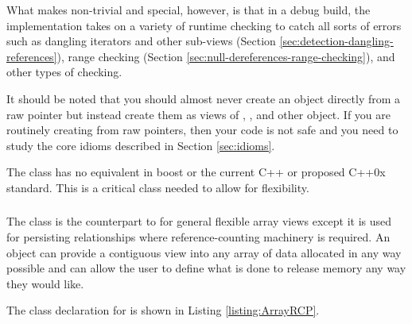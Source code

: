 \documentclass[pdf,ps2pdf,11pt]{SANDreport}
\begin{document}
What makes {} non-trivial and special, however, is
that in a debug build, the implementation takes on a variety of
runtime checking to catch all sorts of errors such as dangling
iterators and other sub-views (Section
{}\ref{sec:detection-dangling-references}), range checking (Section
{}\ref{sec:null-dereferences-range-checking}), and other types of
checking.

It should be noted that you should almost never create an
{} object directly from a raw pointer but instead
create them as views of {}, {},
{} and other {} object.  If you are
routinely creating {} from raw pointers, then your
code is not safe and you need to study the core idioms described in
Section {}\ref{sec:idioms}.

The class {} has no equivalent in boost or the
current C++ or proposed C++0x standard.  This is a critical class
needed to allow for flexibility.


%
{}\subsubsection{}
%

The class {} is the counterpart to
{} for general flexible array views except it is
used for persisting relationships where reference-counting machinery
is required.  An {} object can provide a contiguous
view into any array of data allocated in any way possible and can
allow the user to define what is done to release memory any way they
would like.

The class declaration for {} is shown in
Listing {}\ref{listing:ArrayRCP}.
\end{document}
